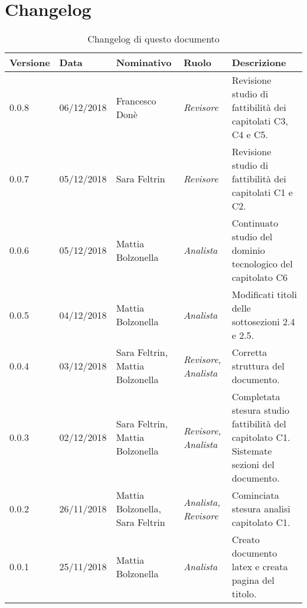 \section{Changelog}
\begin{table}[tbph]
        \centering
        \begin{tabularx}{\textwidth}{|l|l|l|l|X|}
                \hline
                \textbf{Versione} & \textbf{Data} & \textbf{Nominativo}  & \textbf{Ruolo} & 
                \textbf{Descrizione}\\
                \hline \hline
              	0.0.8 & 06/12/2018 & Francesco Donè & \textit{Revisore} & 
              	Revisione studio di fattibilità dei capitolati C3, C4 e C5.\\
                \hline
                0.0.7 & 05/12/2018 & Sara Feltrin & \textit{Revisore} & 
                Revisione studio di fattibilità dei capitolati C1 e C2.\\
                \hline
              	0.0.6 & 05/12/2018 & Mattia Bolzonella & \textit{Analista} & 
              	Continuato studio del dominio tecnologico del capitolato C6\\
              	\hline
              	0.0.5 & 04/12/2018 & Mattia Bolzonella & \textit{Analista} & 
              	Modificati titoli delle sottosezioni 2.4 e 2.5. \\
              	\hline
              	0.0.4 & 03/12/2018 & Sara Feltrin, Mattia Bolzonella 
              	& \textit{Revisore, Analista} & Corretta struttura del documento. \\
              	\hline
              	0.0.3 & 02/12/2018 & Sara Feltrin, Mattia Bolzonella & \textit{Revisore, Analista}
              	& Completata stesura studio fattibilità del capitolato C1.
              	Sistemate sezioni del documento. \\
              	\hline
              	0.0.2 & 26/11/2018 & Mattia Bolzonella, Sara Feltrin & \textit{Analista, Revisore}
              	& Cominciata stesura analisi capitolato C1.\\
                \hline
                0.0.1 & 25/11/2018 & Mattia Bolzonella & \textit{Analista}
                & Creato documento latex e creata pagina del titolo.\\
                \hline
              	
        \end{tabularx}
        \caption{Changelog di questo documento}
\end{table}
